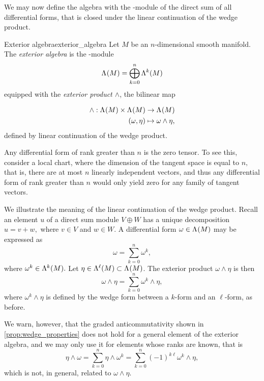 We may now define the algebra with the -module of the direct sum of all differential forms, that is closed under the linear continuation of the wedge product.
\begin{definition}{Exterior algebra}{exterior_algebra}
    Let \(M\) be an \(n\)-dimensional smooth manifold. The \emph{exterior algebra } is the -module
    \begin{equation*}
        \forms{M} = \bigoplus_{k = 0}^n \forms[k]{M}
    \end{equation*}
    equipped with the \emph{exterior product \(\wedge\)}, the bilinear map

    \begin{align*}
        \wedge : \forms{M} \times \forms{M} &\to \forms{M}\\
                             (\omega, \eta) &\mapsto \omega \wedge \eta,
    \end{align*}
    defined by linear continuation of the wedge product.
\end{definition}
\begin{remark}
    Any differential form of rank greater than \(n\) is the zero tensor. To see this, consider a local chart, where the dimension of the tangent space is equal to \(n,\) that is, there are at most \(n\) linearly independent vectors, and thus any differential form of rank greater than \(n\) would only yield zero for any family of tangent vectors.
\end{remark}
\begin{example}
    We illustrate the meaning of the linear continuation of the wedge product. Recall an element \(u\) of a direct sum module \(V \oplus W\) has a unique decomposition \(u = v + w,\) where \(v \in V\) and \(w \in W\). A differential form \(\omega \in \forms{M}\) may be expressed as
    \begin{equation*}
        \omega = \sum_{k = 0}^{n} \omega^k,
    \end{equation*}
    where \(\omega^k \in \forms[k]{M}.\) Let \(\eta \in \forms[\ell]{M} \subset \forms{M}\). The exterior product \(\omega \wedge \eta\) is then
    \begin{equation*}
        \omega \wedge \eta = \sum_{k = 0}^{n} \omega^k \wedge \eta,
    \end{equation*}
    where \(\omega^k \wedge \eta\) is defined by the wedge form between a \(k\)-form and an \(\ell\)-form, as before.

    We warn, however, that the graded anticommutativity shown in \cref{prop:wedge_properties} does not hold for a general element of the exterior algebra, and we may only use it for elements whose ranks are known, that is
    \begin{equation*}
        \eta \wedge \omega = \sum_{k = 0}^{n} \eta \wedge \omega^k = \sum_{k = 0}^n (-1)^{k\ell} \omega^k \wedge \eta,
    \end{equation*}
    which is not, in general, related to \(\omega \wedge \eta\).
\end{example}

